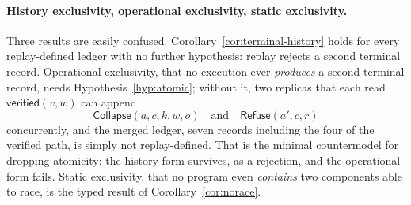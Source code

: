 \documentclass[11pt,openany]{book}
\theoremstyle{remark}
\newcommand{\Refuse}{\mathsf{Refuse}}
\newcommand{\Collapse}{\mathsf{Collapse}}
\begin{document}
\paragraph{History exclusivity, operational exclusivity, static
exclusivity.} Three results are easily confused.
Corollary~\ref{cor:terminal-history} holds for every replay-defined
ledger with no further hypothesis: replay rejects a second terminal
record. Operational exclusivity, that no execution ever \emph{produces} a
second terminal record, needs Hypothesis~\ref{hyp:atomic}; without it,
two replicas that each read $\mathsf{verified}(v,w)$ can append
\[
\Collapse(a,c,k,w,o)\quad\text{and}\quad\Refuse(a',c,r)
\]
concurrently, and the merged ledger, seven records including the four of
the verified path, is simply not replay-defined. That is the minimal
countermodel for dropping atomicity: the history form survives, as a
rejection, and the operational form fails. Static exclusivity, that no
program even \emph{contains} two components able to race, is the typed
result of Corollary~\ref{cor:norace}.
\end{document}
